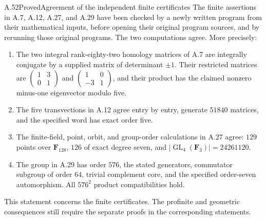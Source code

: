\begin{claim}{A.52}{Proved}{Agreement of the independent finite certificates}
The finite assertions in A.7, A.12, A.27, and A.29 have been checked
by a newly written program from their mathematical inputs, before
opening their original program sources, and by rerunning those original
programs. The two computations agree. More precisely:
\begin{enumerate}
\item The two integral rank-eighty-two homology matrices of A.7 are
integrally conjugate by a supplied matrix of determinant $\pm1$.
Their restricted matrices are
$\left(\begin{smallmatrix}1&3\\0&1\end{smallmatrix}\right)$ and
$\left(\begin{smallmatrix}1&0\\-3&1\end{smallmatrix}\right)$,
and their product has the claimed nonzero minus-one eigenvector
modulo five.
\item The five transvections in A.12 agree entry by entry, generate
$51840$ matrices, and the specified word has exact order five.
\item The finite-field, point, orbit, and group-order calculations
in A.27 agree: $129$ points over $\mathbf F _{128}$, $126$ of exact
degree seven, and $|\operatorname{GL}_4(\mathbf F _3)|=24261120$.
\item The group in A.29 has order $576$, the stated generators,
commutator subgroup of order $64$, trivial complement core, and the
specified order-seven automorphism. All $576^2$ product
compatibilities hold.
\end{enumerate}
This statement concerns the finite certificates. The profinite and
geometric consequences still require the separate proofs in the
corresponding statements.
\end{claim}

